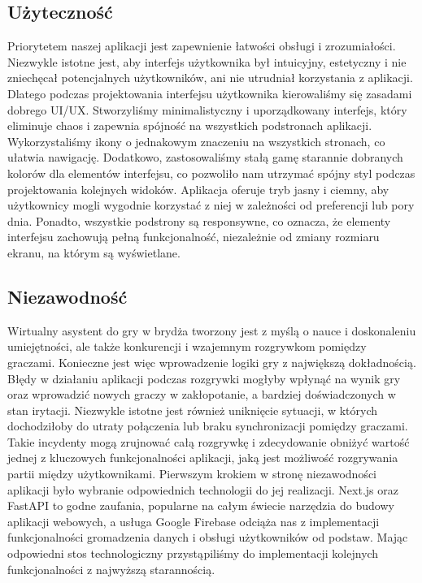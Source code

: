 \subsection{Użyteczność}
Priorytetem naszej aplikacji jest zapewnienie łatwości obsługi i zrozumiałości. Niezwykle istotne jest, aby interfejs użytkownika był intuicyjny, estetyczny i nie zniechęcał potencjalnych użytkowników, ani nie utrudniał korzystania z aplikacji. Dlatego podczas projektowania interfejsu użytkownika kierowaliśmy się zasadami dobrego UI/UX. Stworzyliśmy minimalistyczny i uporządkowany interfejs, który eliminuje chaos i zapewnia spójność na wszystkich podstronach aplikacji. Wykorzystaliśmy ikony o jednakowym znaczeniu na wszystkich stronach, co ułatwia nawigację. Dodatkowo, zastosowaliśmy stałą gamę starannie dobranych kolorów dla elementów interfejsu, co pozwoliło nam utrzymać spójny styl podczas projektowania kolejnych widoków. Aplikacja oferuje tryb jasny i ciemny, aby użytkownicy mogli wygodnie korzystać z niej w zależności od preferencji lub pory dnia. Ponadto, wszystkie podstrony są responsywne, co oznacza, że elementy interfejsu zachowują pełną funkcjonalność, niezależnie od zmiany rozmiaru ekranu, na którym są wyświetlane.
\subsection{Niezawodność}
Wirtualny asystent do gry w brydża tworzony jest z myślą o nauce i doskonaleniu umiejętności, ale także konkurencji i wzajemnym rozgrywkom pomiędzy graczami. Konieczne jest więc wprowadzenie logiki gry z największą dokładnością. Błędy w działaniu aplikacji podczas rozgrywki mogłyby wpłynąć na wynik gry oraz wprowadzić nowych graczy w zakłopotanie, a bardziej doświadczonych w stan irytacji. Niezwykle istotne jest również uniknięcie sytuacji, w których dochodziłoby do utraty połączenia lub braku synchronizacji pomiędzy graczami. Takie incydenty mogą zrujnować całą rozgrywkę i zdecydowanie obniżyć wartość jednej z kluczowych funkcjonalności aplikacji, jaką jest możliwość rozgrywania partii między użytkownikami. Pierwszym krokiem w stronę niezawodności aplikacji było wybranie odpowiednich technologii do jej realizacji. Next.js oraz FastAPI to godne zaufania, popularne na całym świecie narzędzia do budowy aplikacji webowych, a usługa Google Firebase odciąża nas z implementacji funkcjonalności gromadzenia danych i obsługi użytkowników od podstaw. Mając odpowiedni stos technologiczny przystąpiliśmy do implementacji kolejnych funkcjonalności z najwyższą starannością. 
\subsection{}
